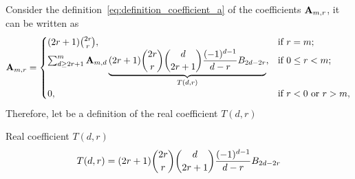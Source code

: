 Consider the definition~\eqref{eq:definition_coefficient_a} of the coefficients ${\mathbf{A}} \sb{m,r}$, it can be written as
\begin{equation*}
    {\mathbf{A}} \sb{m,r} =
    \begin{cases}
    (2r+1)
        \binom{2r}{r}, & \text{if } r=m; \\
        \sum_{d \geq 2r+1}^{m} {\mathbf{A}} \sb{m,d} \underbrace{(2r+1) \binom{2r}{r} \binom{d}{2r+1} \frac{(-1)^{d-1}}{d-r} {B}\sb{2d-2r}}_{T(d,r)}, & \text{if } 0 \leq r<m; \\
        0, & \text{if } r<0 \text{ or } r>m,
    \end{cases}
\end{equation*}
Therefore, let be a definition of the real coefficient $T(d,r)$
\begin{definition}
    Real coefficient $T(d,r)$
    \begin{equation*}
        T(d,r) = (2r+1) \binom{2r}{r} \binom{d}{2r+1} \frac{(-1)^{d-1}}{d-r} {B}\sb{2d-2r}
    \end{equation*}
\end{definition}
